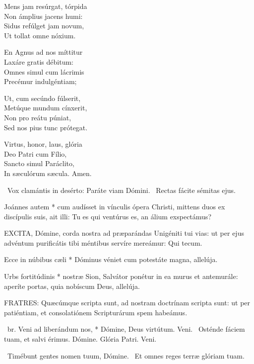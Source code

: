Mens jam resúrgat, tórpida\\
Non ámplius jacens humi:\\
Sidus refúlget jam novum,\\
Ut tollat omne nóxium.

En Agnus ad nos míttitur\\
Laxáre gratis débitum:\\
Omnes simul cum lácrimis\\
Precémur indulgéntiam;

Ut, cum secúndo fúlserit,\\
Metúque mundum cínxerit,\\
Non pro reátu púniat,\\
Sed nos pius tunc prótegat.

Virtus, honor, laus, glória\\
Deo Patri cum Fílio,\\
Sancto simul Paráclito,\\
In sæculórum sæcula. Amen.

\V\ Vox clamántis in desérto: Paráte viam Dómini. \R\ Rectas fácite sémitas ejus.

 Joánnes autem * cum audísset in vínculis ópera Christi, mittens duos ex discípulis suis, ait illi: Tu es qui ventúrus es, an álium exspectámus?


\lettrine[lines=2]{E}{XCITA}, Dómine, corda nostra ad præparándas Unigéniti tui vias: ut per ejus advéntum purificátis tibi méntibus servíre mereámur: Qui tecum.


 Ecce in núbibus cæli * Dóminus véniet cum potestáte magna, allelúja.


 Urbs fortitúdinis * nostræ Sion, Salvátor ponétur in ea murus et antemurále: aperíte portas, quia nobíscum Deus, allelúja.


\lettrine[lines=2]{F}{RATRES}: Quæcúmque scripta sunt, ad nostram doctrínam scripta sunt: ut per patiéntiam, et consolatiónem Scripturárum spem habeámus.

\R\ br. Veni ad liberándum nos, * Dómine, Deus virtútum. Veni. \V\ Osténde fáciem tuam, et salvi érimus. Dómine. Glória Patri. Veni.

\V\ Timébunt gentes nomen tuum, Dómine. \R\ Et omnes reges terræ glóriam tuam.

